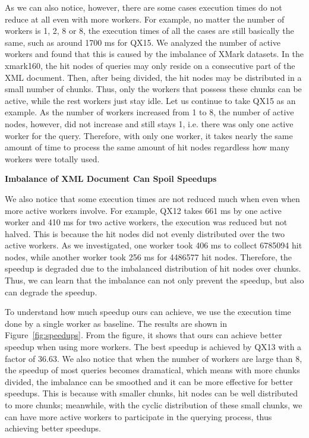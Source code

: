 As we can also notice, however, there are some cases execution times do not
reduce at all even with more workers. For example, no matter the number of
workers is 1, 2, 8 or 8, the execution times of all the cases are still
basically the same, such as around 1700 ms for QX15. We analyzed the number of
active workers and found that this is caused by the imbalance of XMark datasets.
In the xmark160, the hit nodes of queries may only reside on a consecutive part
of the XML document. Then, after being divided, the hit nodes may be distributed
in a small number of chunks. Thus, only the workers that possess these chunks
can be active, while the rest workers just stay idle. Let us continue to take
QX15 as an example. As the number of workers increased from 1 to 8, the number
of active nodes, however, did not increase and still stays 1, i.e. there was
only one active worker for the query. Therefore, with only one worker, it takes
nearly the same amount of time to process the same amount of hit nodes
regardless how many workers were totally used. 

\textbf{Imbalance of XML Document Can Spoil Speedups}

We also notice that some execution times are not reduced much when even when
more active workers involve. For example, QX12 takes 661 ms by one active worker
and 410 ms for two active workers, the execution was reduced but not halved.
This is because the hit nodes did not evenly distributed over the two active
workers. As we investigated, one worker took 406 ms to collect 6785094 hit
nodes, while another worker took 256 ms for 4486577 hit nodes. Therefore, the
speedup is degraded due to the imbalanced distribution of hit nodes over chunks.
Thus, we can learn that the imbalance can not only prevent the speedup, but also
can degrade the speedup.

To understand how much speedup ours can achieve, we use the execution time done
by a single worker as baseline. The results are shown in
Figure~\ref{fig:speedups}.  From the figure, it shows that ours can achieve
better speedup when using more workers. The best speedup is achieved by QX13
with a factor of 36.63. We also notice that when the number of workers are large
than 8, the speedup of most queries becomes dramatical, which means with more
chunks divided, the imbalance can be smoothed and it can be more effective for
better speedups. This is because with smaller chunks, hit nodes can be
well distributed to more chunks; meanwhile, with the cyclic distribution of these
small chunks, we can have more active workers to participate in the querying
process, thus achieving better speedups. 


